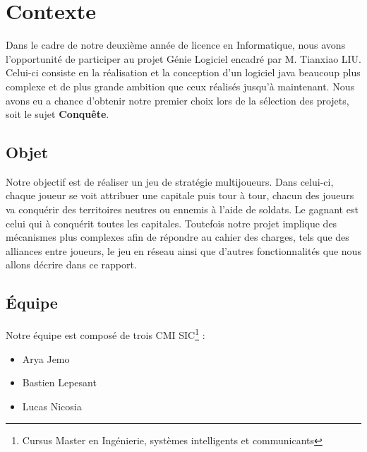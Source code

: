 \section{Contexte}
  Dans le cadre de notre deuxième année de licence en Informatique, nous avons l'opportunité de participer au projet Génie Logiciel encadré par M. Tianxiao LIU.
  Celui-ci consiste en la réalisation et la conception d'un logiciel java beaucoup plus complexe et de plus grande ambition que ceux réalisés jusqu'à maintenant.
  Nous avons eu a chance d'obtenir notre premier choix lors de la sélection des projets, soit le sujet \textbf{Conquête}.
  
  \subsection{Objet}
  Notre objectif est de réaliser un jeu de stratégie multijoueurs. Dans celui-ci, chaque joueur se voit attribuer une capitale puis tour à tour, 
  chacun des joueurs va conquérir des territoires neutres ou ennemis à l'aide de soldats. Le gagnant est celui qui à conquérit toutes les capitales.
 Toutefois notre projet implique des mécanismes plus complexes afin de répondre au cahier des charges, tels que des alliances entre joueurs, le jeu en réseau ainsi que d'autres fonctionnalités que nous allons décrire dans ce rapport.
  \subsection{Équipe}
  Notre équipe est composé de trois CMI SIC\footnote{Cursus Master en Ingénierie, systèmes intelligents et communicants} :
  \begin{itemize}
    \item Arya Jemo
    \item Bastien Lepesant
    \item Lucas Nicosia
  \end{itemize}